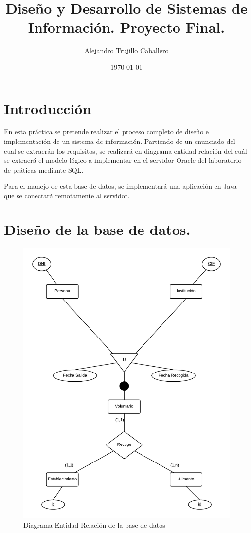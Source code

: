 \documentclass[11pt]{article}
\title{\textbf{\huge{Diseño y Desarrollo de Sistemas de Información. Proyecto Final.}}}
\author{Alejandro Trujillo Caballero}
\date{\today}
\begin{document}
\maketitle
\thispagestyle{empty}
\newpage

\tableofcontents
\newpage

\section{Introducción}

En esta práctica se pretende realizar el proceso completo de diseño e implementación de un sistema de información. Partiendo de un enunciado del cual se extraerán los requisitos, se realizará en diagrama entidad-relación del cuál se extraerá el modelo lógico a implementar en el servidor Oracle del laboratorio de práticas mediante SQL. 

Para el manejo de esta base de datos, se implementará una aplicación en Java que se conectará remotamente al servidor.

\section{Diseño de la base de datos.}

\begin{figure}[H]
\centering
\includegraphics[scale=0.9]{DDSI.png}
\caption{Diagrama Entidad-Relación de la base de datos}
\label{diagrama}
\end{figure}
\end{document}
